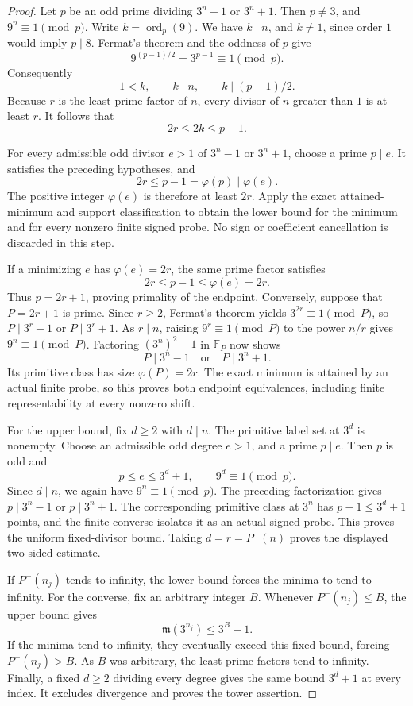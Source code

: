 \documentclass[11pt]{article}
\begin{document}
\begin{proof}
Let \(p\) be an odd prime dividing \(3^n-1\) or \(3^n+1\).
Then \(p\ne3\), and \(9^n\equiv1\pmod p\).
Write \(k=\operatorname{ord}_p(9)\).
We have \(k\mid n\), and \(k\ne1\), since order \(1\)
would imply \(p\mid8\).
Fermat's theorem and the oddness of \(p\) give
\[
                  9^{(p-1)/2}=3^{p-1}\equiv1\pmod p.
\]
Consequently
\[
                  1<k,\qquad k\mid n,\qquad
                                  k\mid(p-1)/2.
\]
Because \(r\) is the least prime factor of \(n\),
every divisor of \(n\) greater than \(1\) is at least \(r\).
It follows that
\[
                              2r\le2k\le p-1.
\]

For every admissible odd divisor \(e>1\) of \(3^n-1\)
or \(3^n+1\), choose a prime \(p\mid e\).
It satisfies the preceding hypotheses, and
\[
                 2r\le p-1=\varphi(p)\mid\varphi(e).
\]
The positive integer \(\varphi(e)\) is therefore at least
\(2r\). Apply the exact attained-minimum and support
classification to obtain the lower bound for the minimum
and for every nonzero finite signed probe. No sign or
coefficient cancellation is discarded in this step.

If a minimizing \(e\) has \(\varphi(e)=2r\), the same
prime factor satisfies
\[
                           2r\le p-1\le\varphi(e)=2r.
\]
Thus \(p=2r+1\), proving primality of the endpoint.
Conversely, suppose that \(P=2r+1\) is prime.
Since \(r\ge2\), Fermat's theorem yields
\(3^{2r}\equiv1\pmod P\), so
\(P\mid3^r-1\) or \(P\mid3^r+1\).
As \(r\mid n\), raising \(9^r\equiv1\pmod P\)
to the power \(n/r\) gives \(9^n\equiv1\pmod P\).
Factoring \((3^n)^2-1\) in \(\mathbb F_P\) now shows
\[
                         P\mid3^n-1
                     \quad\text{or}\quad
                         P\mid3^n+1.
\]
Its primitive class has size \(\varphi(P)=2r\).
The exact minimum is attained by an actual finite probe,
so this proves both endpoint equivalences, including
finite representability at every nonzero shift.

For the upper bound, fix \(d\ge2\) with \(d\mid n\).
The primitive label set at \(3^d\) is nonempty.
Choose an admissible odd degree \(e>1\), and a prime
\(p\mid e\). Then \(p\) is odd and
\[
             p\le e\le3^d+1,\qquad 9^d\equiv1\pmod p.
\]
Since \(d\mid n\), we again have \(9^n\equiv1\pmod p\).
The preceding factorization gives
\(p\mid3^n-1\) or \(p\mid3^n+1\).
The corresponding primitive class at \(3^n\) has
\(p-1\le3^d+1\) points, and the finite converse isolates
it as an actual signed probe. This proves the uniform
fixed-divisor bound. Taking \(d=r=P^-(n)\) proves
the displayed two-sided estimate.

If \(P^-(n_j)\) tends to infinity, the lower bound forces
the minima to tend to infinity.
For the converse, fix an arbitrary integer \(B\).
Whenever \(P^-(n_j)\le B\), the upper bound gives
\[
                        \mathfrak m(3^{n_j})\le3^B+1.
\]
If the minima tend to infinity, they eventually exceed
this fixed bound, forcing \(P^-(n_j)>B\).
As \(B\) was arbitrary, the least prime factors tend
to infinity. Finally, a fixed \(d\ge2\) dividing every
degree gives the same bound \(3^d+1\) at every index.
It excludes divergence and proves the tower assertion.
\end{proof}
\end{document}
